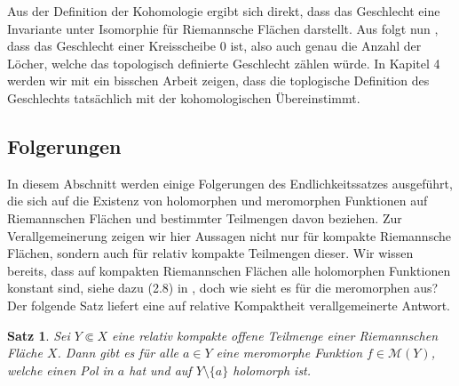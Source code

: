 \documentclass[11pt,a4paper,toc=bibliography]{scrartcl}
\theoremstyle{thm}
\newtheorem{satz}{Satz}[section]
\theoremstyle{def}
\theoremstyle{remark}
\begin{document}
Aus der Definition der Kohomologie ergibt sich direkt, dass das Geschlecht eine Invariante unter Isomorphie für Riemannsche Flächen darstellt.  Aus  folgt nun , dass das Geschlecht einer Kreisscheibe 0 ist, also auch genau die Anzahl der Löcher, welche das topologisch definierte Geschlecht zählen würde. 
In Kapitel 4 werden wir mit ein bisschen Arbeit zeigen, dass die toplogische Definition des Geschlechts tatsächlich mit der kohomologischen Übereinstimmt. 
\subsection{Folgerungen}
In diesem Abschnitt werden einige Folgerungen des Endlichkeitssatzes ausgeführt, die sich auf die Existenz von holomorphen und meromorphen Funktionen auf Riemannschen Flächen und bestimmter Teilmengen davon beziehen.
Zur Verallgemeinerung zeigen wir hier Aussagen nicht nur für kompakte Riemannsche Flächen, sondern auch für relativ kompakte Teilmengen dieser.
Wir wissen bereits, dass auf kompakten Riemannschen Flächen alle holomorphen Funktionen konstant sind, siehe dazu (2.8) in \cite[~S.10]{forster}, doch wie sieht es für die meromorphen aus? Der folgende Satz liefert eine auf relative Kompaktheit verallgemeinerte Antwort.
\begin{satz}
Sei $Y\Subset X$ eine relativ kompakte offene Teilmenge einer Riemannschen Fläche $X$. Dann gibt es für alle $a\in Y$ eine meromorphe Funktion $f\in \mathcal{M}(Y)$, welche einen Pol in $a$ hat und auf $Y\setminus\{ a \}$ holomorph ist.
\end{satz}
\end{document}
